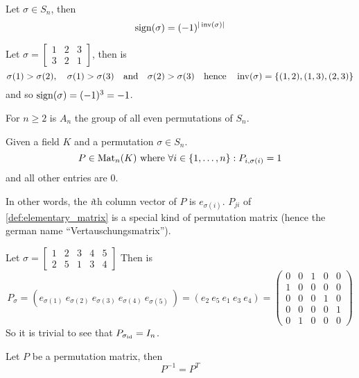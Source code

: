 \begin{proposition}
   Let \(\sigma \in S_n\), then
   \[\operatorname{sign}(\sigma) = (-1)^{|\operatorname{inv}(\sigma)|}\]
\end{proposition}
\begin{example}
   Let \(\sigma = \begin{bmatrix} 1 & 2 & 3\\ 3 & 2 & 1\end{bmatrix}\), then is
   \[\sigma(1) > \sigma(2),\quad \sigma(1) > \sigma(3) \quad\text{and}\quad \sigma(2) > \sigma(3) \quad\text{hence}\quad \operatorname{inv}(\sigma) = \{(1,2), (1, 3), (2, 3)\}\]
   and so \(\operatorname{sign}(\sigma) = (-1)^3 = -1\).
\end{example}

\begin{definition}
   For \(n \geq 2\) is \(A_n\) the group of all even permutations of \(S_n\).
\end{definition}

\begin{definition}\label{def:perm_mat}
   Given a field \(K\) and a permutation \(\sigma \in S_n\).
   \[P \in \operatorname{Mat}_n(K)~\text{where}~\forall i \in \{1, \ldots, n\}: P_{i, \sigma(i)} = 1\]
   and all other entries are 0.
\end{definition}
\begin{remark}
   In other words, the \textit{i}th column vector of \(P\) is \(e_{\sigma(i)}\).
   \(P_{ji}\) of \cref{def:elementary_matrix} is a special kind of permutation matrix (hence the german name ``Vertauschungsmatrix'').
\end{remark}
\begin{example}
   Let \(\sigma = \begin{bmatrix}1&2&3&4&5\\2&5&1&3&4\end{bmatrix}\)
   Then is
   \[P_\sigma = (e_{\sigma(1)}~e_{\sigma(2)}~e_{\sigma(3)}~e_{\sigma(4)}~e_{\sigma(5)}~) = (e_2~e_5~e_1~e_3~e_4) = \begin{pmatrix}0&0&1&0&0\\1&0&0&0&0\\0&0&0&1&0\\0&0&0&0&1\\0&1&0&0&0\end{pmatrix}\]
   So it is trivial to see that \(P_{\sigma_{\operatorname{id}}} = I_n\).
\end{example}

\begin{proposition}
   Let \(P\) be a permutation matrix, then
   \[P^{-1} = P^T\]
\end{proposition}

